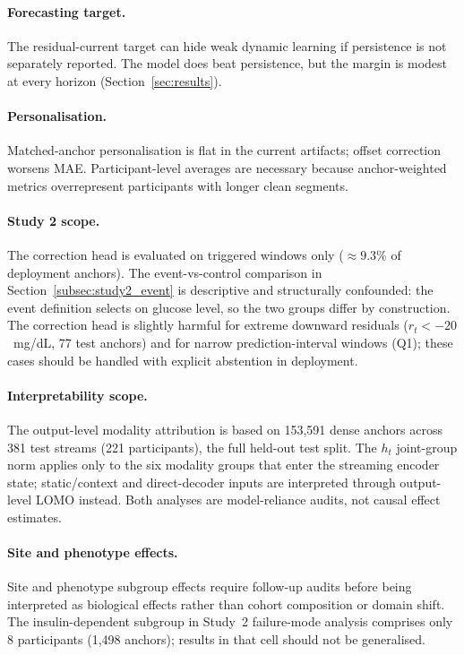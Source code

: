 \paragraph{Forecasting target.}
The residual-current target can hide weak dynamic learning if persistence is not
separately reported.
The model does beat persistence, but the margin is modest at every horizon
(Section~\ref{sec:results}).

\paragraph{Personalisation.}
Matched-anchor personalisation is flat in the current artifacts; offset correction
worsens MAE.
Participant-level averages are necessary because anchor-weighted metrics
overrepresent participants with longer clean segments.

\paragraph{Study 2 scope.}
The correction head is evaluated on triggered windows only ($\approx 9.3\%$ of
deployment anchors).
The event-vs-control comparison in Section~\ref{subsec:study2_event} is
descriptive and structurally confounded: the event definition selects on glucose
level, so the two groups differ by construction.
The correction head is slightly harmful for extreme downward residuals
($r_t < -20$~mg/dL, 77 test anchors) and for narrow prediction-interval windows
(Q1); these cases should be handled with explicit abstention in deployment.

\paragraph{Interpretability scope.}
The output-level modality attribution is based on 153{,}591 dense anchors
across 381 test streams (221 participants), the full held-out test split.
The $h_t$ joint-group norm applies only to the six modality groups that enter
the streaming encoder state; static/context and direct-decoder inputs are
interpreted through output-level LOMO instead.
Both analyses are model-reliance audits, not causal effect estimates.

\paragraph{Site and phenotype effects.}
Site and phenotype subgroup effects require follow-up audits before being
interpreted as biological effects rather than cohort composition or domain shift.
The insulin-dependent subgroup in Study~2 failure-mode analysis comprises only
8 participants (1{,}498 anchors); results in that cell should not be
generalised.

